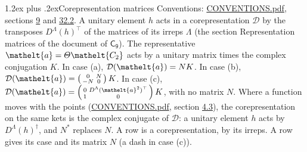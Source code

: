 \documentclass[10pt,a4paper]{article}
\makeatletter
\renewcommand\section{\@startsection{section}{1}{\z@}{-3ex plus -1ex minus -.2ex}%
  {1.2ex plus .2ex}{\normalfont\large\sffamily\bfseries\color{parttitle}}}
\numberwithin{equation}{section}
\newcommand{\eltfont}[1]{{\let\sigma\eltsigma\mathelt{#1}}}
\newcommand{\grp}[1]{\mathsf{#1}}
\newcommand{\elt}[1]{\eltfont{#1}}
\makeatother
\begin{document}
\section{Corepresentation matrices}\label{s:corep_matrices}
Conventions: \href{../../CONVENTIONS.pdf}{CONVENTIONS.pdf}, sections \href{../../../rotation/CONVENTIONS.pdf\#conv.9}{9} and \href{../../CONVENTIONS.pdf\#conv.32.2}{32.2}.
A unitary element $h$ acts in a corepresentation $\mathcal{D}$ by the transposes $D^{\Lambda}(h)^{\top}$ of the matrices of its irreps $\Lambda$ (the section Representation matrices of the document of \href{../../../rotation/data/pdf/C9.pdf}{$\grp{C_{9}}$}). The representative $\elt{a} = \varTheta\elt{C_{2}}$ acts by a unitary matrix times the complex conjugation $K$.
In case (a), $\mathcal{D}(\elt{a}) = NK$. In case (b), $\mathcal{D}(\elt{a}) = \left(\begin{smallmatrix} 0 & N \\ -N & 0 \end{smallmatrix}\right) K$. In case (c), $\mathcal{D}(\elt{a}) = \left(\begin{smallmatrix} 0 & D^{\Lambda}(\elt{a}^2)^{\top} \\ 1 & 0 \end{smallmatrix}\right) K$, with no matrix $N$.
Where a function moves with the points (\href{../../CONVENTIONS.pdf}{CONVENTIONS.pdf}, section \href{../../../rotation/CONVENTIONS.pdf\#conv.4.3}{4.3}), the corepresentation on the same kets is the complex conjugate of $\mathcal{D}$: a unitary element $h$ acts by $D^{\Lambda}(h)^{\dagger}$, and $N^{*}$ replaces $N$.
A row is a corepresentation, by its irreps. A row gives its case and its matrix $N$ (a dash in case (c)).
\end{document}
